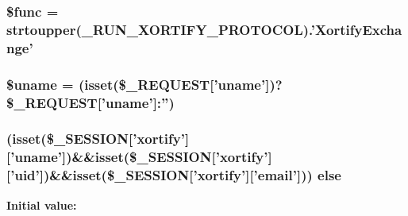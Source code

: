 \hypertarget{xortify_2post_8loader_8php_aacfa30e81347998f3a6fd1903c2c05d3}{
\subsubsection[{\$func}]{\setlength{\rightskip}{0pt plus 5cm}\$func = strtoupper({\bf \-\_\-\-R\-U\-N\-\_\-\-X\-O\-R\-T\-I\-F\-Y\-\_\-\-P\-R\-O\-T\-O\-C\-O\-L}).'Xortify\-Exchange'}}\label{xortify_2post_8loader_8php_aacfa30e81347998f3a6fd1903c2c05d3}
\hypertarget{xortify_2post_8loader_8php_a227a9443cabbe5e23cfc10c4371e09d1}{
\subsubsection[{\$uname}]{\setlength{\rightskip}{0pt plus 5cm}\$uname = (isset(\$\-\_\-\-R\-E\-Q\-U\-E\-S\-T\mbox{[}'uname'\mbox{]})?\$\-\_\-\-R\-E\-Q\-U\-E\-S\-T\mbox{[}'uname'\mbox{]}\-:'')}}\label{xortify_2post_8loader_8php_a227a9443cabbe5e23cfc10c4371e09d1}
\hypertarget{xortify_2post_8loader_8php_a99f38b0c8c178a9286d03586510aa646}{
\subsubsection[{else}]{ (isset(\$\-\_\-\-S\-E\-S\-S\-I\-O\-N\mbox{[}'xortify'\mbox{]}\mbox{[}'uname'\mbox{]})\&\&isset(\$\-\_\-\-S\-E\-S\-S\-I\-O\-N\mbox{[}'xortify'\mbox{]}\mbox{[}'uid'\mbox{]})\&\&isset(\$\-\_\-\-S\-E\-S\-S\-I\-O\-N\mbox{[}'xortify'\mbox{]}\mbox{[}'email'\mbox{]})) else}}\label{xortify_2post_8loader_8php_a99f38b0c8c178a9286d03586510aa646}
{\bfseries Initial value\-:}
